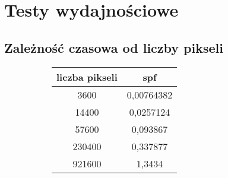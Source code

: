 \section{Testy wydajnościowe}

\subsection{Zależność czasowa od liczby pikseli}


\begin{figure}[!ht]
\advance\leftskip-2cm
\begin{subfigure}{.5\textwidth}
\end{subfigure}
\hspace{2cm}
\begin{subfigure}{.5\textwidth}
		\begin{longtable}{|c|c|} \hline
	    liczba pikseli & spf \\ \hline
	    3600 & 0,00764382 \\ 
	    14400 & 0,0257124 \\
		57600 & 0,093867 \\
		230400 & 0,337877 \\
		921600 & 1,3434 \\
		\hline
		\end{longtable}
\end{subfigure}
\end{figure}

